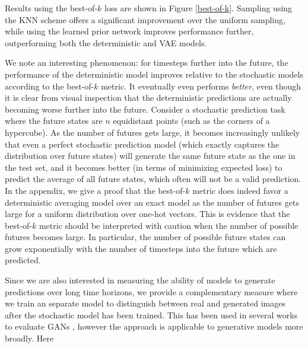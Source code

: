 \documentclass{article}
\begin{document}
Results using the best-of-$k$ loss are shown in Figure \ref{best-of-k}.
Sampling using the KNN scheme offers a significant improvement over the uniform sampling, while using the learned prior network improves performance further, outperforming both the deterministic and VAE models.

We note an interesting phenomenon: for timesteps further into the future, the performance of the deterministic model improves relative to the stochastic models according to the best-of-$k$ metric. It eventually even performs \textit{better}, even though it is clear from visual inspection that the deterministic predictions are actually becoming worse further into the future.
Consider a stochastic prediction task where the future states are $n$ equidistant points (such as the corners of a hypercube).
As the number of futures gets large, it becomes increasingly unlikely that even a perfect stochastic prediction model (which exactly captures the distribution over future states) will generate the same future state as the one in the test set, and it becomes better (in terms of minimizing expected loss) to predict the average of all future states, which often will not be a valid prediction.
In the appendix, we give a proof that the best-of-$k$ metric does indeed favor a deterministic averaging model over an exact model as the number of futures gets large for a uniform distribution over one-hot vectors.
This is evidence that the best-of-$k$ metric should be interpreted with caution when the number of possible futures becomes large.
In particular, the number of possible future states can grow exponentially with the number of timesteps into the future which are predicted.


Since we are also interested in measuring the ability of models to generate predictions over long time horizons, we provide a complementary measure where we train an separate model to distinguish between real and generated images after the stochastic model has been trained.
This has been used in several works to evaluate GANs \citep{Danihelka17, Rosca17, GANeval}, however the approach is applicable to generative models more broadly.
Here
\end{document}

